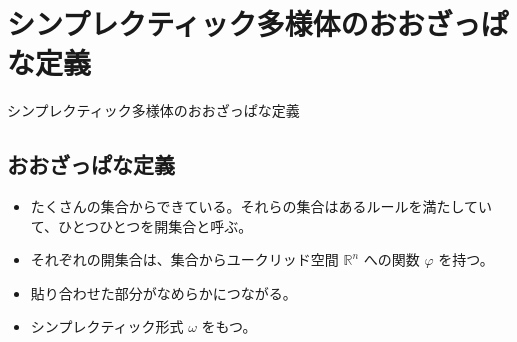 \maketitle

\newpage

\tableofcontents

\newpage


\section{ シンプレクティック多様体のおおざっぱな定義 }

シンプレクティック多様体のおおざっぱな定義

\newpage


\subsection{ おおざっぱな定義 }

\begin{itemize}
  \item たくさんの集合からできている。それらの集合はあるルールを満たしていて、ひとつひとつを開集合と呼ぶ。
  \item それぞれの開集合は、集合からユークリッド空間 $ \mathbb{R}^n $ への関数 $ \varphi $ を持つ。
  \item 貼り合わせた部分がなめらかにつながる。
  \item シンプレクティック形式 $ \omega $ をもつ。
\end{itemize}

\newpage
